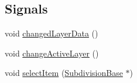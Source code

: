\subsection*{Signals}
\begin{DoxyCompactItemize}
\item 
void \hyperlink{classShipCADGeometry_1_1SubdivisionSurface_a92e81f5ebe2eaf3098bab70eca4d6680}{changed\-Layer\-Data} ()
\item 
void \hyperlink{classShipCADGeometry_1_1SubdivisionSurface_acf56ae03aa0270d1f6703b781113f67a}{change\-Active\-Layer} ()
\item 
void \hyperlink{classShipCADGeometry_1_1SubdivisionSurface_a88100cb22d00cba4a0e3e0c347507f54}{select\-Item} (\hyperlink{classShipCADGeometry_1_1SubdivisionBase}{Subdivision\-Base} $\ast$)
\end{DoxyCompactItemize}
